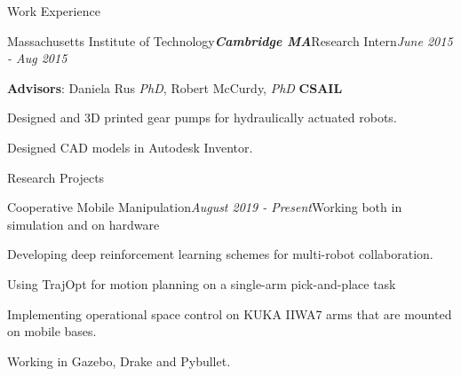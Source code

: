 \documentclass{resume} %
\begin{document}
\begin{rSection}{Work Experience}
\begin{rSubsection}{Massachusetts Institute of Technology}{\bf \em Cambridge MA}{Research Intern}{\em June 2015 - Aug 2015}
\item {\bf Advisors}: Daniela Rus {\em PhD},   Robert McCurdy, {\em PhD} \hfill {\bf CSAIL}
\item Designed and 3D printed gear pumps for hydraulically actuated robots.
\item Designed CAD models in Autodesk Inventor.
\end{rSubsection}

\end{rSection}



\begin{rSection}{Research Projects}

\begin{rSubsection}{Cooperative Mobile Manipulation}{\em August 2019 - Present}{Working both in simulation and on hardware}{}
\item Developing deep reinforcement learning schemes for multi-robot collaboration.
\item Using TrajOpt for motion planning on a single-arm pick-and-place task
\item Implementing operational space control on KUKA IIWA7 arms that are mounted on mobile bases.
\item Working in Gazebo, Drake and Pybullet.
\end{rSubsection}

\end{rSection}
\end{document}
